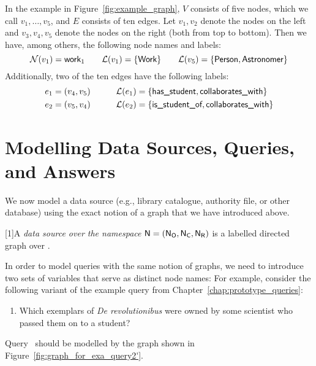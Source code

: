 In the example in Figure~\ref{fig:example_graph},
$V$ consists of five nodes, which we call $v_1,\dots,v_5$,
and $E$ consists of ten edges. Let $v_1,v_2$ denote the nodes on the left and $v_3,v_4,v_5$
denote the nodes on the right (both from top to bottom).
Then we have, among others, the following node names and labels:
%
\begin{equation*}
  \mathcal{N}(v_1) = \textsf{work}_1
  \qquad
  \mathcal{L}(v_1) = \{\textsf{Work}\}
  \qquad
  \mathcal{L}(v_5) = \{\textsf{Person},\textsf{Astronomer}\}
\end{equation*}
%
Additionally, two of the ten edges have the following labels:
%
\begin{alignat*}{2}
  e_1 & = (v_4,v_5) & \qquad \mathcal{L}(e_1) & = \{\textsf{has\_student},\textsf{collaborates\_with}\} \\
  e_2 & = (v_5,v_4) &        \mathcal{L}(e_2) & = \{\textsf{is\_student\_of},\textsf{collaborates\_with}\} \\
\end{alignat*}

\section{Modelling Data Sources, Queries, and Answers}
\label{sec:modelling}

We now model a data source (e.g., library catalogue, authority file, or other database)
using the exact notion of a graph that we have introduced above.
%
\begin{definition}
  \scalebox{0.973}[1]{A \emph{data source over the namespace $\textup{\textsf{N}}=(\mathsf{N}_\mathsf{O},\mathsf{N}_\mathsf{C},\mathsf{N}_\mathsf{R})$} is a labelled directed graph
  over \namespace.}
\end{definition}
%
%
In order to model queries with the same notion of graphs, we need to introduce
two sets of variables that serve as distinct node names:
For example, consider the following variant of the example query  from Chapter~\ref{chap:prototype_queries}:
%
\begin{enumerate}
  \item[\exaquery{2$'$}]
    Which exemplars of \emph{De revolutionibus} were owned by some scientist who passed them on to a student?
\end{enumerate}
%
Query~
should be modelled by the graph shown in Figure~\ref{fig:graph_for_exa_query2'}.

